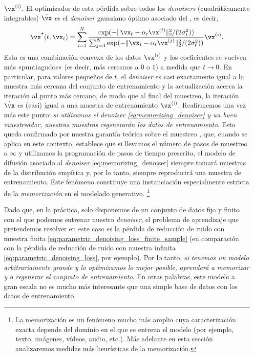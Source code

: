 \documentclass[../../book-main.tex]{subfiles}
\begin{document}
\(\vx^{(i)}\). El optimizador de esta pérdida sobre todos los
\textit{denoisers} (cuadráticamente integrables) \(\bar{\vx}\) es el \textit{denoiser} gaussiano óptimo asociado
del , es decir,
\begin{equation}\label{eq:memorizing_denoiser}
    \bar{\vx}^{\star}(t, \vx_{t}) = \sum_{i =
    1}^{N}\frac{\exp({-\|\vx_{t} -
    \alpha_{t}\vx^{(i)}\|_{2}^{2}/(2\sigma_{t}^{2})})}{\sum_{j =
        1}^{N}\exp({-\|\vx_{t} -
    \alpha_{t}\vx^{(j)}\|_{2}^{2}/(2\sigma_{t}^{2})})}\vx^{(i)}.
\end{equation}
Esta es una combinación convexa de los datos \(\vx^{(i)}\) y los
coeficientes se vuelven más «puntiagudos» (es decir, más cercanos a \(0\) o \(1\)) a medida que \(t
\to 0\). En particular, para valores pequeños de \(t\), el \textit{denoiser} es casi
exactamente igual a la muestra más cercana del conjunto de entrenamiento y la
actualización acerca la iteración al punto más cercano, de modo que al
final del muestreo, la iteración \(\hat{\vx}\) es (casi) igual a una
muestra de entrenamiento  \(\vx^{(i)}\). Reafirmemos una vez más este punto:
\textit{si utilizamos el \textit{denoiser} \eqref{eq:memorizing_denoiser} y un
buen muestreador, nuestras muestras regenerarán los datos de entrenamiento}. Esto
queda confirmado por nuestra garantía teórica sobre el muestreo
, que, cuando se aplica en
este contexto, establece que si llevamos el número de pasos de muestreo a
\(\infty\) y utilizamos la programación de pasos de tiempo prescrito, el modelo de difusión
asociado al \textit{denoiser} \eqref{eq:memorizing_denoiser}
siempre tomará muestras de la distribución empírica y, por lo tanto, siempre
reproducirá una muestra de entrenamiento. Este fenómeno constituye una instanciación especialmente estricta
de la \textit{memorización} en el modelado generativo.
\footnote{La memorización es un fenómeno mucho más amplio cuya
    caracterización exacta depende del dominio en el que se entrena el modelo
    (por ejemplo, texto, imágenes, vídeos, audio, etc.). Más adelante en esta sección
analizaremos medidas más heurísticas de la memorización.}

Dado que, en la práctica, solo disponemos de un conjunto de datos fijo y finito con el que podemos
entrenar nuestro \textit{denoiser}, el problema de aprendizaje que pretendemos resolver en este caso
es la pérdida de reducción de ruido con muestra finita
\eqref{eq:parametric_denoising_loss_finite_sample} (en comparación con la
    pérdida de reducción de ruido con muestra infinita \eqref{eq:parametric_denoising_loss},
por ejemplo). Por lo tanto, \textit{si tenemos un modelo arbitrariamente grande
    y lo optimizamos lo mejor posible, aprenderá a memorizar y
a regenerar el conjunto de entrenamiento}. En otras palabras, este modelo a gran escala
no es mucho más interesante que una simple base de datos con los datos de entrenamiento.
\end{document}
